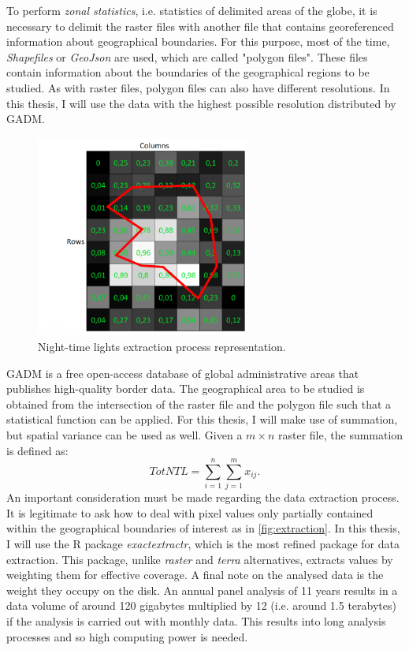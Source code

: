 To perform \textit{zonal statistics}, i.e. statistics of delimited areas of the globe, it is necessary to delimit the raster files with another file that contains georeferenced information about geographical boundaries. For this purpose, most of the time, \textit{Shapefiles} or \textit{GeoJson} are used, which are called "polygon files". These files contain information about the boundaries of the geographical regions to be studied. As with raster files, polygon files can also have different resolutions. In this thesis, I will use the data with the highest possible resolution distributed by GADM.
\begin{figure}[h]
    \begin{center}
    \includegraphics[width=7cm]{images/raster_night_cover.png}
    \end{center}
    \caption{Night-time lights extraction process representation.}
    \label{fig:extraction}
\end{figure}
GADM is a free open-access database of global administrative areas that publishes high-quality border data.
The geographical area to be studied is obtained from the intersection of the raster file and the polygon file such that a statistical function can be applied. For this thesis, I will make use of summation, but spatial variance can be used as well.
Given a $m\times n$ raster file, the summation is defined as:
\begin{equation}
    TotNTL=\sum_{i=1}^n\sum_{j=1}^m x_{ij}.
\end{equation}
An important consideration must be made regarding the data extraction process. It is legitimate to ask how to deal with pixel values only partially contained within the geographical boundaries of interest as in \autoref{fig:extraction}. In this thesis, I will use the R package {\it exactextractr}, which is the most refined package for data extraction. This package, unlike {\it raster} and {\it terra} alternatives, extracts values by weighting them for effective coverage. 
A final note on the analysed data is the weight they occupy on the disk. An annual panel analysis of 11 years results in a data volume of around 120 gigabytes multiplied by 12 (i.e. around 1.5 terabytes) if the analysis is carried out with monthly data. This results into long analysis processes and so high computing power is needed.

